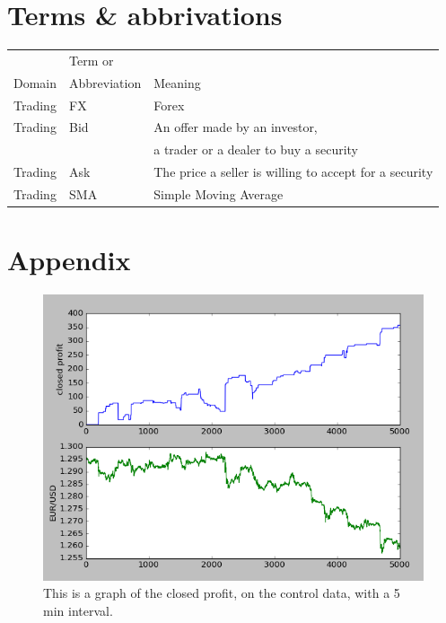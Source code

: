 \documentclass[10pt]{IEEEtran}
\begin{document}
\section{Terms \& abbrivations}
\begin{table}[h!]
\begin{tabularx}{0.5\textwidth}{ l | l | X }
& Term or &\\
Domain & Abbreviation & Meaning\\
\hline
Trading & FX & Forex \\ 
Trading & Bid & An offer made by an investor,\\
& & a trader or a dealer to buy a security\\
Trading & Ask & The price a seller is willing to accept for a security\\
Trading & SMA & Simple Moving Average\\
\end{tabularx}
\end{table}




\newpage

\section{Appendix}
\pagebreak
\begin{figure}
    \includegraphics[scale = 0.5]{data-96-10000-20.png}
    \caption{This is a graph of the closed profit, on the control data, with a 5 min interval.}
\end{figure}
\end{document}
